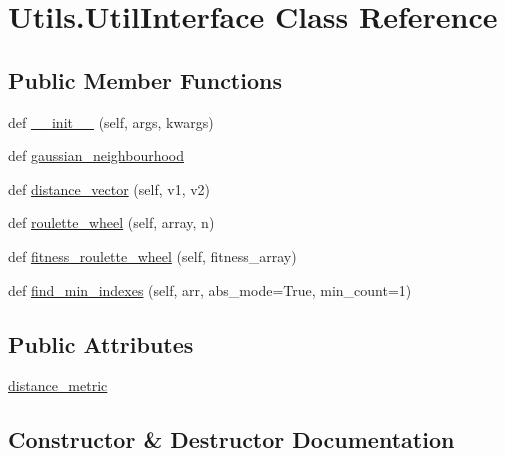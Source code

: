 \hypertarget{classUtils_1_1UtilInterface}{}\section{Utils.\+Util\+Interface Class Reference}
\label{classUtils_1_1UtilInterface}
\subsection*{Public Member Functions}
\begin{DoxyCompactItemize}
\item 
def \hyperlink{classUtils_1_1UtilInterface_afe33b5c91ee32dabf96fd7daa3f8376c}{\+\_\+\+\_\+init\+\_\+\+\_\+} (self, args, kwargs)
\item 
def \hyperlink{classUtils_1_1UtilInterface_a102f07d65ccb2fc68e5ac8c1b1c10081}{gaussian\+\_\+neighbourhood}
\item 
def \hyperlink{classUtils_1_1UtilInterface_a11a56686a81620284e09482768cc2a96}{distance\+\_\+vector} (self, v1, v2)
\item 
def \hyperlink{classUtils_1_1UtilInterface_a71d897a0850290b06348b55b87d3770a}{roulette\+\_\+wheel} (self, array, n)
\item 
def \hyperlink{classUtils_1_1UtilInterface_a758b72985713ad2f339803ac47e9bc04}{fitness\+\_\+roulette\+\_\+wheel} (self, fitness\+\_\+array)
\item 
def \hyperlink{classUtils_1_1UtilInterface_a7b41165f128c553847891855f80dd725}{find\+\_\+min\+\_\+indexes} (self, arr, abs\+\_\+mode=True, min\+\_\+count=1)
\end{DoxyCompactItemize}
\subsection*{Public Attributes}
\begin{DoxyCompactItemize}
\item 
\hyperlink{classUtils_1_1UtilInterface_a4f27f45ae8e2c27850bc1b4ea1dd018a}{distance\+\_\+metric}
\end{DoxyCompactItemize}


\subsection{Constructor \& Destructor Documentation}
\mbox{\label{classUtils_1_1UtilInterface_afe33b5c91ee32dabf96fd7daa3f8376c}} 
